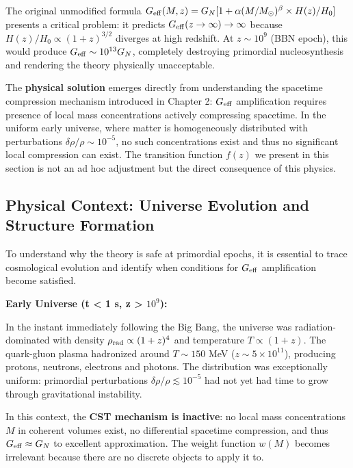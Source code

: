 \documentclass[11pt,a4paper]{article}
\begin{document}
The original unmodified formula
\(G_{\rm eff}(M,z) = G_N[1 + \alpha(M/M_\odot)^\beta \times H(z)/H_0]\)
presents a critical problem: it predicts
\(G_{\rm eff}(z \to \infty) \to \infty\) because
\(H(z)/H_0 \propto (1+z)^{3/2}\) diverges at high redshift. At
\(z \sim 10^9\) (BBN epoch), this would produce
\(G_{\rm eff} \sim 10^{13} G_N\), completely destroying primordial
nucleosynthesis and rendering the theory physically unacceptable.

The \textbf{physical solution} emerges directly from understanding the
spacetime compression mechanism introduced in Chapter 2: \(G_{\rm eff}\)
amplification requires presence of local mass concentrations actively
compressing spacetime. In the uniform early universe, where matter is
homogeneously distributed with perturbations
\(\delta\rho/\rho \sim 10^{-5}\), no such concentrations exist and thus
no significant local compression can exist. The transition function
\(f(z)\) we present in this section is not an ad hoc adjustment but the
direct consequence of this physics.

\hypertarget{physical-context-universe-evolution-and-structure-formation}{%
\subsection{Physical Context: Universe Evolution and Structure
Formation}\label{physical-context-universe-evolution-and-structure-formation}}

To understand why the theory is safe at primordial epochs, it is
essential to trace cosmological evolution and identify when conditions
for \(G_{\rm eff}\) amplification become satisfied.

\textbf{Early Universe (t \textless{} 1 s, z \textgreater{} $10^{9}$):}

In the instant immediately following the Big Bang, the universe was
radiation-dominated with density \(\rho_{\rm rad} \propto (1+z)^4\) and
temperature \(T \propto (1+z)\). The quark-gluon plasma hadronized
around \(T \sim 150\) MeV (\(z \sim 5 \times 10^{11}\)), producing
protons, neutrons, electrons and photons. The distribution was
exceptionally uniform: primordial perturbations
\(\delta\rho/\rho \lesssim 10^{-5}\) had not yet had time to grow
through gravitational instability.

In this context, the \textbf{CST mechanism is inactive}: no local mass
concentrations \(M\) in coherent volumes exist, no differential
spacetime compression, and thus \(G_{\rm eff} \approx G_N\) to excellent
approximation. The weight function \(w(M)\) becomes irrelevant because
there are no discrete objects to apply it to.
\end{document}

